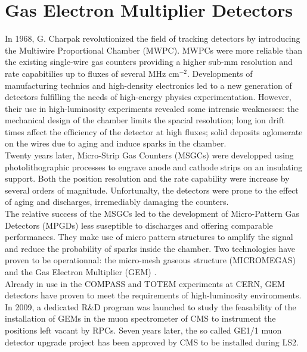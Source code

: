 \chapter{Gas Electron Multiplier Detectors}
\label{chap:II-1-gem}

  In 1968, G. Charpak revolutionized the field of tracking detectors by introducing the Multiwire Proportional Chamber (MWPC). MWPCs were more reliable than the existing single-wire gas counters providing a higher sub-mm resolution and rate capabitilies up to fluxes of several MHz cm$^{-2}$. Developments of manufacturing technics and high-density electronics led to a new generation of detectors fulfilling the needs of high-energy physics experimentation. However, their use in high-luminosity experiments revealed some intrensic weaknesses: the mechanical design of the chamber limits the spacial resolution; long ion drift times affect the efficiency of the detector at high fluxes; solid deposits aglomerate on the wires due to aging and induce sparks in the chamber. \\

  Twenty years later, Micro-Strip Gas Counters (MSGCs) were developped using photolithographic processes to engrave anode and cathode strips on an insulating support. Both the position resolution and the rate capability were increase by several orders of magnitude. Unfortunalty, the detectors were prone to the effect of aging and discharges, irremediably damaging the counters. \\

  The relative success of the MSGCs led to the development of Micro-Pattern Gas Detectors (MPGDs) less suseptible to discharges and offering comparable performances. They make use of micro pattern structures to amplify the signal and reduce the probability of sparks inside the chamber. Two technologies have proven to be operationnal: the micro-mesh gaseous structure (MICROMEGAS) and the Gas Electron Multiplier (GEM) \cite{SAULI1997531}. \\

  Already in use in the COMPASS and TOTEM experiments at CERN, GEM detectors have proven to meet the requirements of high-luminosity environments. In 2009, a dedicated R\&D program was launched to study the feasability of the installation of GEMs in the muon spectrometer of CMS to instrument the positions left vacant by RPCs. Seven years later, the so called GE1/1 muon detector upgrade project has been approved by CMS to be installed during LS2.

